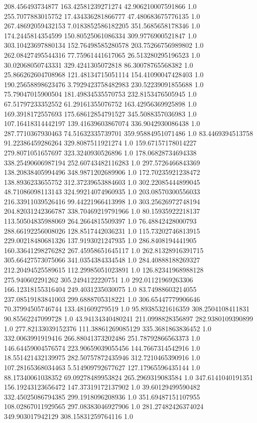 208.456493734877	163.42581239271274	42.906210007591866	1.0
255.7077883015752	17.434336281866777	47.480683675776135	1.0
267.48692059432153	7.0183852586182205	351.5685658178346	1.0
174.2445814354599	150.80525061086334	309.9776900521847	1.0
303.10423697880134	152.76498585280578	203.75266756989802	1.0
262.08427495544316	77.75961441617065	26.513280295196523	1.0
30.02068050743331	329.4241305072818	86.30078765568382	1.0
25.866262604708968	121.48134715051114	154.41090047428403	1.0
190.25658898623476	3.7929423758482983	230.52239091855688	1.0
75.79047015900504	181.49834535570753	232.8153476505945	1.0
67.51797233352552	61.29161355076752	163.42956369925898	1.0
169.3918172557693	175.68612854791527	345.5088357036983	1.0
107.16418314442197	139.41639603867074	336.9042930086438	1.0
287.7710367930463	74.51632335739701	359.95884951071486	1.0
83.4469394513758	91.22386459286264	329.8087511921274	1.0
159.67157178014227	279.8071051657697	323.3240930526896	1.0
178.06828734694338	338.25490606987194	252.60743482116283	1.0
297.5726466843369	138.20838405994496	348.9871202689906	1.0
172.70235921238472	138.8936233655752	312.37239653884603	1.0
302.22085444899045	48.71086098113143	324.99214074960935	1.0
203.08570300556033	216.33911039526416	99.44221966413998	1.0
303.25626972748194	204.82031242366787	338.70469219791966	1.0
80.15935922218137	113.50504835988069	264.2664815509397	1.0
76.48842428000793	288.66192256008026	128.8517442036231	1.0
115.73202746813915	229.00218480681326	137.9193021247935	1.0
286.8408194441905	160.33641298276282	267.45958651645117	1.0
262.81328916391715	305.66427573075066	341.0354384334548	1.0
284.40888188269327	212.20494525589615	112.29985051023891	1.0
126.82341968988128	275.940602291262	305.2494122220751	1.0
292.01121969263306	166.12318155316404	249.4031235030075	1.0
83.74988603214055	237.08519183841003	299.6888705318221	1.0
306.65447779906646	70.37994505746744	133.481609279519	1.0
95.89385321616359	308.2504108411831	90.85562247099728	1.0
43.94134340480241	211.0998828356897	282.9380109390899	1.0
277.82133039152376	111.38861269085129	335.3681863836452	1.0
332.0063991919416	266.88041373202486	251.78792866563373	1.0
146.64459004576574	223.90659039055456	144.7667314542916	1.0
18.551421432139975	282.50757872435946	312.7210465390916	1.0
107.28165368034463	5.514909792677627	127.17965596435144	1.0
88.17340061038352	69.09278489953824	265.2969319083584	1.0
347.6141040191351	156.19243123656472	147.37319172137902	1.0
39.60129499590482	332.45025086794385	299.1918096208936	1.0
351.69487151107955	108.02867011929565	297.08383046927906	1.0
281.27482426374024	349.903017942129	308.15831259764116	1.0
